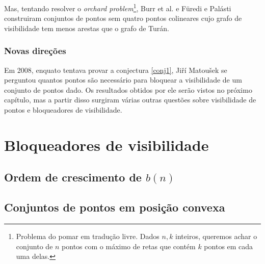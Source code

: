 \documentclass[a4paper]{book}
\begin{document}
Mas, tentando resolver o \textit{orchard problem}\footnote{Problema do pomar em tradução livre. Dados $n,k$ inteiros, queremos achar o conjunto de $n$ pontos com o máximo de retas que contém $k$ pontos em cada uma delas.}, Burr et al. e Füredi e Palásti construiram conjuntos de pontos sem quatro pontos colineares cujo grafo de visibilidade tem menos arestas que o grafo de Turán.

\subsection {Novas direções}

Em 2008, enquato tentava provar a conjectura \ref{conj1}, Jiří Matoušek se perguntou quantos pontos são necessário para bloquear a visibilidade de um conjunto de pontos dado. Os resultados obtidos por ele serão vistos no próximo capítulo, mas a partir disso surgiram várias outras questões sobre visibilidade de pontos e bloqueadores de visibilidade.

\chapter{Bloqueadores de visibilidade}

\section{Ordem de crescimento de $b(n)$}
\cite{block,blockers}

\section{Conjuntos de pontos em posição convexa}
\cite{block,blockers}



{}
\end{document}
